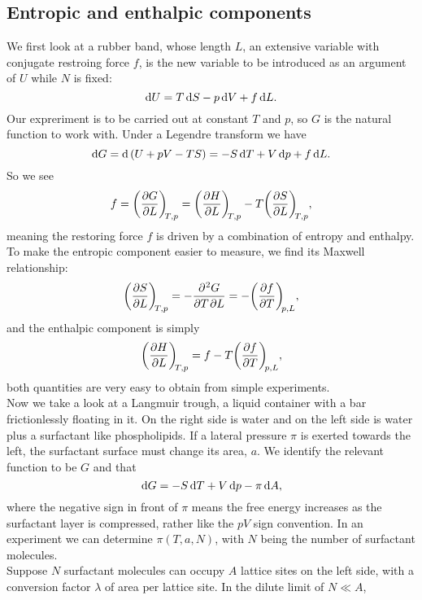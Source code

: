 \subsection{Entropic and enthalpic components}
We first look at a rubber band, whose length $L$, an extensive variable with conjugate restroing force $f$, is the new variable to be introduced as an argument of $U$ while $N$ is fixed: 
\begin{equation}
\dif U=T\dif S-p\dif V+f\dif L.
\end{equation}
Our expreriment is to be carried out at constant $T$ and $p$, so $G$ is the natural function to work with. Under a Legendre transform we have
\begin{equation}
\dif G=\dif\ (U+pV-TS)=-S\dif T+V\dif p+f\dif L.
\end{equation}
So we see
\begin{equation}
f=\diffp GL[T,p]=\diffp HL[T,p]-T\diffp SL[T,p],
\end{equation}
meaning the restoring force $f$ is driven by a combination of entropy and enthalpy. 
To make the entropic component easier to measure, we find its Maxwell relationship: 
\begin{equation}
\diffp SL[T,p]=-\diffp{G}{T,L}=-\diffp fT[p,L], 
\end{equation}
and the enthalpic component is simply
\begin{equation}
\diffp HL[T,p]=f-T\diffp fT[p,L],
\end{equation}
both quantities are very easy to obtain from simple experiments. \\
Now we take a look at a Langmuir trough, a liquid container with a bar frictionlessly floating in it. 
On the right side is water and on the left side is water plus a surfactant like phospholipids. 
If a lateral pressure $\pi$ is exerted towards the left, the surfactant surface must change its area, $a$. 
We identify the relevant function to be $G$ and that 
\begin{equation}
\label{g_surf}
\dif G=-S\dif T+V\dif p-\pi\dif A, 
\end{equation}
where the negative sign in front of $\pi$ means the free energy increases as the surfactant layer is compressed, rather like the $pV$ sign convention. 
In an experiment we can determine $\pi(T,a,N)$, with $N$ being the number of surfactant molecules. \\
Suppose $N$ surfactant molecules can occupy $A$ lattice sites on the left side, with a conversion factor $\lambda$ of area per lattice site. 
In the dilute limit of $N\ll A$, 
